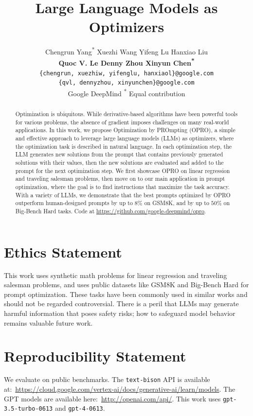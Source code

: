 \documentclass{article}
\title{Large Language Models as Optimizers}
\author{
Chengrun Yang\textsuperscript{*} \hspace{.5em}
Xuezhi Wang \hspace{.5em}
Yifeng Lu \hspace{.5em}
Hanxiao Liu \hspace{.5em}\\
\textbf{
Quoc V. Le \hspace{.5em}
Denny Zhou \hspace{.5em} 
Xinyun Chen\textsuperscript{*}
}
\\
[1ex]
\texttt{\{chengrun, xuezhiw, yifenglu, hanxiaol\}@google.com} \\
\texttt{\{qvl, dennyzhou, xinyunchen\}@google.com}\\
[1ex]
Google DeepMind \quad \textsuperscript{*} Equal contribution\\
}
\theoremstyle{plain}
\theoremstyle{definition}
\theoremstyle{remark}
\newcommand{\name}{OPRO}
\begin{document}
\maketitle
\thispagestyle{firstpage}
\vspace{-1em}
\begin{abstract}
Optimization is ubiquitous. While derivative-based algorithms have been powerful tools for various problems, the absence of gradient imposes challenges on many real-world applications.
In this work, we propose Optimization by PROmpting (\name{}), a simple and effective approach to leverage large language models (LLMs) as optimizers, where the optimization task is described in natural language. In each optimization step, the LLM generates new solutions from the prompt that contains previously generated solutions with their values, then the new solutions are evaluated and added to the prompt for the next optimization step. We first showcase \name{} on linear regression and traveling salesman problems, then move on to our main application in prompt optimization, where the goal is to find instructions that maximize the task accuracy. With a variety of LLMs, we demonstrate that the best prompts optimized by \name{} outperform human-designed prompts by up to $8\%$ on GSM8K, and by up to $50\%$ on Big-Bench Hard tasks.
Code at \url{https://github.com/google-deepmind/opro}.
\end{abstract}









\section*{Ethics Statement}
This work uses synthetic math problems for linear regression and traveling salesman problems, and uses public datasets like GSM8K and Big-Bench Hard for prompt optimization.
These tasks have been commonly used in similar works and should not be regarded controversial.
There is a peril that LLMs may generate harmful information that poses safety risks; how to safeguard model behavior remains valuable future work.

\section*{Reproducibility Statement}

We evaluate on public benchmarks. The \texttt{text-bison} API is available at:~\url{https://cloud.google.com/vertex-ai/docs/generative-ai/learn/models}. The GPT models are available here:~\url{http://openai.com/api/}. 
This work uses \texttt{gpt-3.5-turbo-0613} and \texttt{gpt-4-0613}.
\end{document}
